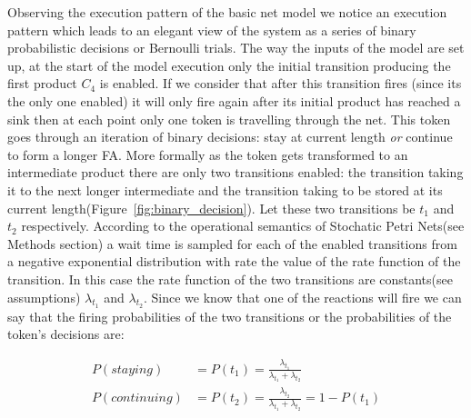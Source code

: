 Observing the execution pattern of the basic net model we notice an
execution pattern which leads to an elegant view of the system as a
series of binary probabilistic decisions or Bernoulli trials. The way
the inputs of the model are set up, at the start of the model
execution only the initial transition producing the first product $C_4$ is
enabled. If we consider that after this transition fires (since its
the only one enabled) it
will only fire again after its initial product has reached a sink then
at each point only one token is travelling through the net. This token
goes through an iteration of binary decisions: stay at current length
\textit{or} continue to form a longer
FA. More formally as the token gets
transformed to an intermediate product there are only two transitions
enabled: the transition taking it to the next longer intermediate and
the transition taking to be stored at its current length(Figure~\ref{fig:binary_decision}). Let these
two transitions be $t_1$ and $t_2$ respectively. According to
the operational semantics of Stochatic Petri Nets(see Methods section)
a wait time is sampled for each of the enabled transitions from a
negative exponential distribution with rate the value of the rate
function of the
transition. In this case the rate function of the two transitions are
constants(see assumptions) $\lambda_{t_1}$ and $\lambda_{t_2}$. Since
we know that one of the reactions will fire we can say that the
firing probabilities of the two transitions or the probabilities of
the token's decisions are:

\begin{align*}
P(staying)& =P(t_1) = \frac{\lambda_{t_1}}{\lambda_{t_1} + \lambda_{t_2}}\\
P(continuing) & = P(t_2) = \frac{\lambda_{t_2}}{\lambda_{t_1} + \lambda_{t_2}} = 1 - P(t_1)\\
\end{align*}

